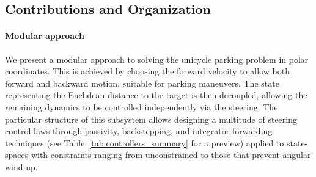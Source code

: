 \documentclass[journal,twoside,web]{ieeecolor}
\newcommand{\xmark}{\ding{55}}%
\theoremstyle{definition}
\begin{document}


\subsection{Contributions and Organization}

\paragraph{Modular approach} We present a modular approach to solving the unicycle parking problem in polar coordinates. This is achieved by choosing the forward velocity to allow both forward and backward motion, suitable for parking maneuvers. The state representing the Euclidean distance to the target is then decoupled, allowing the remaining dynamics to be controlled independently via the steering. The particular structure of this subsystem allows designing a multitude of steering control laws through passivity, backstepping, and integrator forwarding techniques (see Table~\ref{tab:controllers_summary} for a preview) applied to state-spaces with constraints ranging from unconstrained to those that prevent angular wind-up.
\end{document}
